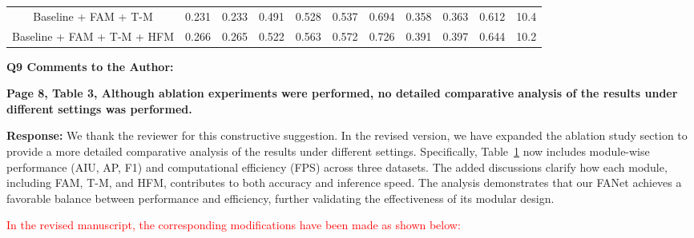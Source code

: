 \documentclass[lettersize,journal,onecolumn,12pt]{IEEEtran}
\begin{document}
\begin{table}[]
{\begin{tabular}{@{}c|ccc|ccc|ccc|c@{}}
Baseline + FAM + T-M              & 0.231                        & 0.233                        & 0.491                        & 0.528                        & 0.537                        & 0.694                        & 0.358                        & 0.363                        & 0.612                        & 10.4                           \\
Baseline + FAM + T-M + HFM        & {\color[HTML]{FE0000} 0.266} & {\color[HTML]{FE0000} 0.265} & {\color[HTML]{FE0000} 0.522} & {\color[HTML]{FE0000} 0.563} & {\color[HTML]{FE0000} 0.572} & {\color[HTML]{FE0000} 0.726} & {\color[HTML]{FE0000} 0.391} & {\color[HTML]{FE0000} 0.397} & {\color[HTML]{FE0000} 0.644} & {\color[HTML]{FE0000} 10.2}    \\ \bottomrule
\end{tabular}}
\label{abla}
\end{table}





\clearpage


{\color{BlueGreen} \textbf{Q9 Comments to the Author:}

\textbf{Page 8, Table 3, Although ablation experiments were performed, no detailed comparative analysis of the results under different settings was performed.}} 

\textbf{Response:} 
We thank the reviewer for this constructive suggestion. 
In the revised version, we have expanded the ablation study section to provide a more detailed comparative analysis of the results under different settings.
Specifically, Table~\ref{abla} now includes module-wise performance (AIU, AP, F1) and computational efficiency (FPS) across three datasets.
The added discussions clarify how each module, including FAM, T-M, and HFM, contributes to both accuracy and inference speed.
The analysis demonstrates that our FANet achieves a favorable balance between performance and efficiency, further validating the effectiveness of its modular design. 

\textcolor{red}{In the revised manuscript, the corresponding modifications have been made as shown below:}






\end{document}
